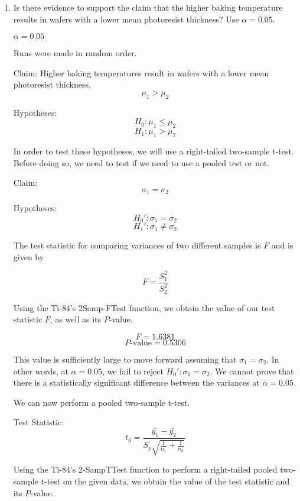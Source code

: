 \documentclass[../main.tex]{subfiles}
\begin{document}
\begin{enumerate}[label = (\alph*)]
    \item\label{31A}
        Is there evidence to support the claim that the higher baking temperature results in wafers with a lower mean photoresist thickness?
        Use \(\alpha = 0.05\).

        \givens{}
        \(\alpha = 0.05\)

        \assumptions{}
        Runs were made in random order.

        \solution{}

        Claim: Higher baking temperatures result in wafers with a lower mean photoresist thickness.
        \[\mu_1 > \mu_2\]

        Hypotheses:
        \[H_0 : \mu_1 \le \mu_2\]
        \[H_1 : \mu_1 > \mu_2\]

        In order to test these hypotheses, we will use a right-tailed two-sample t-test.
        Before doing so, we need to test if we need to use a pooled test or not. 

        Claim: 
        \[\sigma_1 = \sigma_2\]
        
        Hypotheses:
        \[H_0' : \sigma_1 = \sigma_2\]
        \[H_1' : \sigma_1 \ne \sigma_2\]
        
        The test statistic for comparing variances of two different samples is $F$ and is given by

        \[
            F = \frac{S_1^2}{S_2^2}    
        \]

        Using the Ti-84's 2Samp-FTest function, we obtain the value of our test statistic $F$, as well as its $P$-value.

        \[F = 1.6381\]
        \[P\textrm{-value} = 0.5306\]

        This value is sufficiently large to move forward assuming that \(\sigma_1=\sigma_2\). 
        In other words, at \(\alpha = 0.05\), we fail to reject \(H_0' : \sigma_1 = \sigma_2\).
        We cannot prove that there is a statistically significant difference between the variances at \(\alpha = 0.05\).

        We can now perform a pooled two-sample t-test.

        Test Statistic:
        \[
            t_0 = \frac{\bar{y_1}-\bar{y_2}}{S_p \sqrt{\frac{1}{n_1} + \frac{1}{n_2}}}
        \]

        Using the Ti-84's 2-SampTTest function to perform a right-tailed pooled two-sample t-test on the given data, we obtain the value of the test statistic and its $P$-value.


\end{enumerate}
\end{document}
